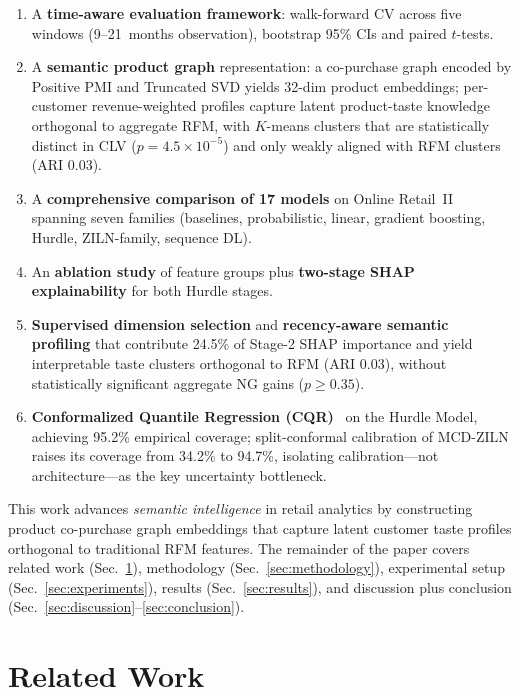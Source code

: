\documentclass[pdflatex,sn-mathphys-num]{sn-jnl}
\theoremstyle{thmstyleone}
\theoremstyle{thmstyletwo}
\theoremstyle{thmstylethree}
\begin{document}
\begin{enumerate}
\item A \textbf{time-aware evaluation framework}: walk-forward CV
across five windows (9--21~months observation), bootstrap 95\% CIs
and paired $t$-tests.
\item A \textbf{semantic product graph} representation: a co-purchase
graph encoded by Positive PMI and Truncated SVD yields 32-dim
product embeddings; per-customer revenue-weighted profiles capture
latent product-taste knowledge orthogonal to aggregate RFM, with
$K$-means clusters that are statistically distinct in CLV
($p{=}4.5\!\times\!10^{-5}$) and only weakly aligned with RFM clusters
(ARI $0.03$).
\item A \textbf{comprehensive comparison of 17 models} on Online
Retail~II spanning seven families (baselines, probabilistic, linear,
gradient boosting, Hurdle, ZILN-family, sequence DL).
\item An \textbf{ablation study} of feature groups plus \textbf{two-stage
SHAP explainability} for both Hurdle stages.
\item \textbf{Supervised dimension selection} and \textbf{recency-aware
semantic profiling} that contribute 24.5\% of Stage-2 SHAP importance
and yield interpretable taste clusters orthogonal to RFM (ARI $0.03$),
without statistically significant aggregate NG gains ($p\geq 0.35$).
\item \textbf{Conformalized Quantile Regression
(CQR)}~\cite{romano2019conformalized} on the Hurdle Model, achieving
95.2\% empirical coverage; split-conformal calibration of MCD-ZILN
raises its coverage from 34.2\% to 94.7\%, isolating calibration---not
architecture---as the key uncertainty bottleneck.
\end{enumerate}

This work advances \emph{semantic intelligence} in retail analytics
by constructing product co-purchase graph embeddings that capture
latent customer taste profiles orthogonal to traditional RFM features.
The remainder of the paper covers related work
(Sec.~\ref{sec:related}), methodology (Sec.~\ref{sec:methodology}),
experimental setup (Sec.~\ref{sec:experiments}), results
(Sec.~\ref{sec:results}), and discussion plus conclusion
(Sec.~\ref{sec:discussion}--\ref{sec:conclusion}).

\section{Related Work}\label{sec:related}
\end{document}
